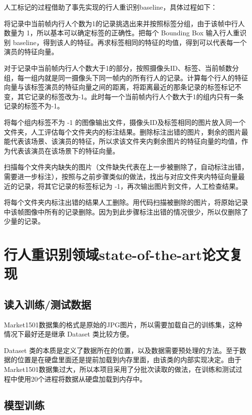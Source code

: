 人工标记的过程借助了事先实现的行人重识别baseline，具体过程如下：

将记录中当前帧内行人个数为1的记录挑选出来并按照标签分组，由于该帧中行人数量为 1，所以基本可以确定标签的正确性。把每个 Bounding Box 输入行人重识别 baseline，得到该人的特征。再求标签相同的特征的均值，得到可以代表每一个演员的特征向量。

对于记录中当前帧内行人个数大于1的部分，按照摄像头ID、标签、当前帧数分组，每一组内就是同一摄像头下同一帧内的所有行人的记录。计算每个行人的特征向量与该标签演员的特征向量之间的距离，将距离最近的那条记录的标签标记不变，其它记录的标签改为-1。此时每一个当前帧内行人个数大于1的组内只有一条记录的标签不为-1。

将每个组内标签不为 -1 的图像输出文件，摄像头ID及标签相同的图片放入同一个文件夹，人工评估每个文件夹内的标注结果。删除标注出错的图片，剩余的图片最能代表该场景、该演员的特征，所以求该文件夹内剩余图片的特征向量的均值，作为代表该演员在该场景下的特征向量。

扫描每个文件夹内缺失的图片（文件缺失代表在上一步被删除了，自动标注出错，需要进一步标注），按照与之前步骤类似的做法，找出与对应文件夹内特征向量最近的记录，将其它记录的标签标记为 -1，再次输出图片到文件，人工检查结果。

将每个文件夹内标注出错的结果人工删除。用代码扫描被删除的图片，将原始记录中该帧图像中所有的记录删除。因为到此步骤标注出错的情况很少，所以仅删除了少量的记录。

\section{行人重识别领域state-of-the-art论文复现}

\subsection{读入训练/测试数据}
Market1501数据集的格式是原始的JPG图片，所以需要加载自己的训练集，这种情况下最好还是继承 Dataset 类比较方便。

Dataset 类的本质是定义了数据所在的位置，以及数据需要预处理的方法。至于数据的位置是在硬盘里面还是提前加载到内存里面，由该类的内部实现决定。由于Market1501数据集过大，所以本项目采用了分批次读取的做法，在训练和测试过程中使用20个进程将数据从硬盘加载到内存中。

\subsection{模型训练}

